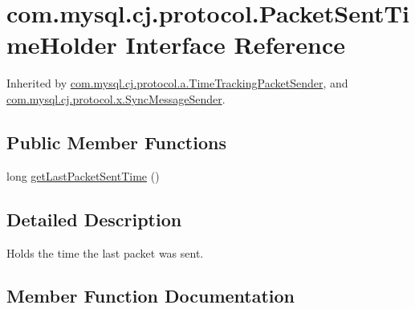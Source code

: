 \hypertarget{interfacecom_1_1mysql_1_1cj_1_1protocol_1_1_packet_sent_time_holder}{}\section{com.\+mysql.\+cj.\+protocol.\+Packet\+Sent\+Time\+Holder Interface Reference}
\label{interfacecom_1_1mysql_1_1cj_1_1protocol_1_1_packet_sent_time_holder}


Inherited by \mbox{\hyperlink{classcom_1_1mysql_1_1cj_1_1protocol_1_1a_1_1_time_tracking_packet_sender}{com.\+mysql.\+cj.\+protocol.\+a.\+Time\+Tracking\+Packet\+Sender}}, and \mbox{\hyperlink{classcom_1_1mysql_1_1cj_1_1protocol_1_1x_1_1_sync_message_sender}{com.\+mysql.\+cj.\+protocol.\+x.\+Sync\+Message\+Sender}}.

\subsection*{Public Member Functions}
\begin{DoxyCompactItemize}
\item 
long \mbox{\hyperlink{interfacecom_1_1mysql_1_1cj_1_1protocol_1_1_packet_sent_time_holder_a0f02a4b248787dd3852b5258a9aa5918}{get\+Last\+Packet\+Sent\+Time}} ()
\end{DoxyCompactItemize}


\subsection{Detailed Description}
Holds the time the last packet was sent. 

\subsection{Member Function Documentation}
\mbox{\label{interfacecom_1_1mysql_1_1cj_1_1protocol_1_1_packet_sent_time_holder_a0f02a4b248787dd3852b5258a9aa5918}} 
